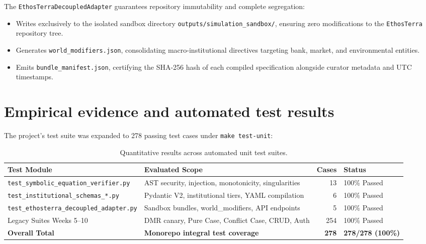 \documentclass[11pt,a4paper]{article}
\begin{document}
The \texttt{EthosTerraDecoupledAdapter} guarantees repository immutability and complete segregation:
\begin{itemize}[leftmargin=*]
    \item Writes exclusively to the isolated sandbox directory \texttt{outputs/simulation\_sandbox/}, ensuring zero modifications to the \texttt{EthosTerra} repository tree.
    \item Generates \texttt{world\_modifiers.json}, consolidating macro-institutional directives targeting bank, market, and environmental entities.
    \item Emits \texttt{bundle\_manifest.json}, certifying the SHA-256 hash of each compiled specification alongside curator metadata and UTC timestamps.
\end{itemize}

\section{Empirical evidence and automated test results}

The project's test suite was expanded to 278 passing test cases under \texttt{make test-unit}:

\begin{table}[H]
\centering
\small
\caption{Quantitative results across automated unit test suites.}
\label{tab:tests}
\begin{tabularx}{\textwidth}{lp{6.0cm}rX}
\toprule
\textbf{Test Module} & \textbf{Evaluated Scope} & \textbf{Cases} & \textbf{Status} \\
\midrule
\texttt{test\_symbolic\_equation\_verifier.py} & AST security, injection, monotonicity, singularities & 13 & 100\% Passed \\
\texttt{test\_institutional\_schemas\_*.py} & Pydantic V2, institutional tiers, YAML compilation & 6 & 100\% Passed \\
\texttt{test\_ethosterra\_decoupled\_adapter.py} & Sandbox bundles, world\_modifiers, API endpoints & 5 & 100\% Passed \\
Legacy Suites Weeks 5--10 & DMR canary, Pure Case, Conflict Case, CRUD, Auth & 254 & 100\% Passed \\
\midrule
\textbf{Overall Total} & \textbf{Monorepo integral test coverage} & \textbf{278} & \textbf{278/278 (100\%)} \\
\bottomrule
\end{tabularx}
\end{table}
\end{document}
